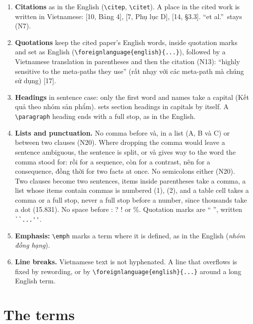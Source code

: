 \documentclass[11pt,a4paper]{article}
\DeclareRobustCommand{\code}[1]{\texttt{\detokenize{#1}}}
\newcommand{\vi}[1]{\foreignlanguage{vietnamese}{#1}}
\begin{document}
\begin{enumerate}[label=S\arabic*]
        take the singular: \vi{Mục 6 và 7}, \vi{Bảng 9 và 10}, \vi{Hình 1b}.
  \item \textbf{Citations} as in the English (\verb|\citep|, \verb|\citet|). A place in the cited
        work is written in Vietnamese: \vi{[10, Bảng 4]}, \vi{[7, Phụ lục D]}, \vi{[14, §3.3]}.
        ``et al.''\ stays (N7).
  \item \textbf{Quotations} keep the cited paper's English words, inside quotation marks and set
        as English (\verb|\foreignlanguage{english}{...}|), followed by a Vietnamese translation
        in parentheses and then the citation (N13): ``highly sensitive to the meta-paths they
        use'' (\vi{rất nhạy với các meta-path mà chúng sử dụng}) [17].
  \item \textbf{Headings} in sentence case: only the first word and names take a capital
        (\vi{Kết quả theo nhóm sản phẩm}). \code{acmart} sets section headings in capitals by
        itself. A \verb|\paragraph| heading ends with a full stop, as in the English.
  \item \textbf{Lists and punctuation.} No comma before \vi{và}, in a list (\vi{A, B và C}) or
        between two clauses (N20). Where dropping the comma would leave a sentence ambiguous, the
        sentence is split, or \vi{và} gives way to the word the comma stood for: \vi{rồi} for a
        sequence, \vi{còn} for a contrast, \vi{nên} for a consequence, \vi{đồng thời} for two facts
        at once. No semicolons either (N20). Two clauses become two sentences, items inside
        parentheses take a comma, a list whose items contain commas is numbered (1), (2), and a
        table cell takes a comma or a full stop, never a full stop before a number, since
        thousands take a dot (15.831). No space before : ? ! or \%. Quotation marks are \vi{“ ”},
        written \verb|``...''|.
  \item \textbf{Emphasis:} \verb|\emph| marks a term where it is defined, as in the English
        (\vi{\emph{nhóm đồng hạng}}).
  \item \textbf{Line breaks.} Vietnamese text is not hyphenated. A line that overflows is fixed by
        rewording, or by \verb|\foreignlanguage{english}{...}| around a long English term.
\end{enumerate}

\section{The terms}\label{sec:terms}
\end{document}
